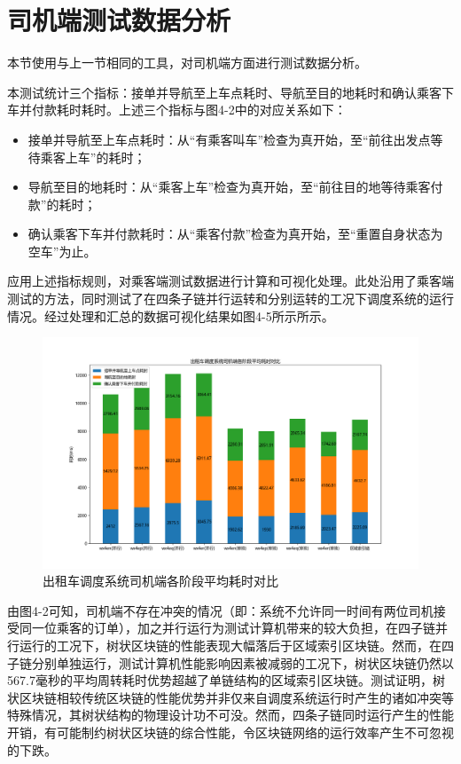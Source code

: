 \section{司机端测试数据分析}

本节使用与上一节相同的工具，对司机端方面进行测试数据分析。

本测试统计三个指标：接单并导航至上车点耗时、导航至目的地耗时和确认乘客下车并付款耗时耗时。上述三个指标与图4-2中的对应关系如下：

\begin{itemize}
    \item 接单并导航至上车点耗时：从“有乘客叫车”检查为真开始，至“前往出发点等待乘客上车”的耗时；
    \item 导航至目的地耗时：从“乘客上车”检查为真开始，至“前往目的地等待乘客付款”的耗时；
    \item 确认乘客下车并付款耗时：从“乘客付款”检查为真开始，至“重置自身状态为空车”为止。
\end{itemize}

应用上述指标规则，对乘客端测试数据进行计算和可视化处理。此处沿用了乘客端测试的方法，同时测试了在四条子链并行运转和分别运转的工况下调度系统的运行情况。经过处理和汇总的数据可视化结果如图4-5所示所示。

\begin{figure}[htbp]
    \centering
    \includegraphics[width=\textwidth]{images/司机端测试.png}
    \caption{出租车调度系统司机端各阶段平均耗时对比}\label{司机端平均耗时对比} %
\end{figure}

由图4-2可知，司机端不存在冲突的情况（即：系统不允许同一时间有两位司机接受同一位乘客的订单），加之并行运行为测试计算机带来的较大负担，在四子链并行运行的工况下，树状区块链的性能表现大幅落后于区域索引区块链。然而，在四子链分别单独运行，测试计算机性能影响因素被减弱的工况下，树状区块链仍然以567.7毫秒的平均周转耗时优势超越了单链结构的区域索引区块链。测试证明，树状区块链相较传统区块链的性能优势并非仅来自调度系统运行时产生的诸如冲突等特殊情况，其树状结构的物理设计功不可没。然而，四条子链同时运行产生的性能开销，有可能制约树状区块链的综合性能，令区块链网络的运行效率产生不可忽视的下跌。

